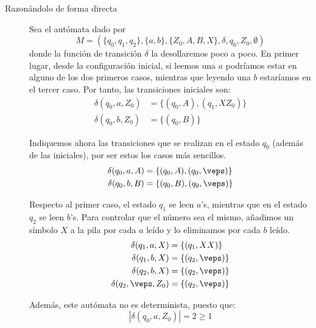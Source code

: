 \begin{ejercicio}
\begin{enumerate}
        \begin{description}
            \item[Razonándolo de forma directa] Sea el autómata dado por
            $$M = (\{q_0,q_1,q_2\},\{a,b\},\{Z_0,A,B, X\},\delta,q_0,Z_0,\emptyset)$$
            donde la función de transición $\delta$ la desollaremos poco a poco. En primer lugar, desde la configuración inicial, si leemos una $a$ podríamos estar en alguno de los dos primeros casos, mientras que leyendo una $b$ estaríamos en el tercer caso. Por tanto, las transiciones iniciales son:
            \begin{align*}
                \delta(q_0,a,Z_0) &= \{(q_0,A), (q_1, XZ_0)\} \\
                \delta(q_0,b,Z_0) &= \{(q_0,B)\}
            \end{align*}
    
            Indiquemos ahora las transiciones que se realizan en el estado $q_0$ (además de las iniciales), por ser estos los casos más sencillos.
            \begin{align*}
                \delta(q_0,a,A) &= \{(q_0,A), (q_0, \veps)\} \\
                \delta(q_0,b,B) &= \{(q_0,B), (q_0, \veps)\}
            \end{align*}
    
            Respecto al primer caso, el estado $q_1$ se leen $a$'s, mientras que en el estado $q_2$ se leen $b$'s. Para controlar que el número sea el mismo, añadimos un símbolo $X$ a la pila por cada $a$ leído y lo eliminamos por cada $b$ leído.
            \begin{align*}
                \delta(q_1,a,X) &= \{(q_1,XX)\} \\
                \delta(q_1,b,X) &= \{(q_2,\veps)\} \\
                \delta(q_2,b,X) &= \{(q_2,\veps)\} \\
                \delta(q_2,\veps,Z_0) &= \{(q_2,\veps)\}
            \end{align*}
    
            Además, este autómata no es determinista, puesto que:
            \begin{equation*}
                |\delta(q_0,a,Z_0)|=2\geq 1
            \end{equation*}
            

\end{description}
\end{enumerate}
\end{ejercicio}
